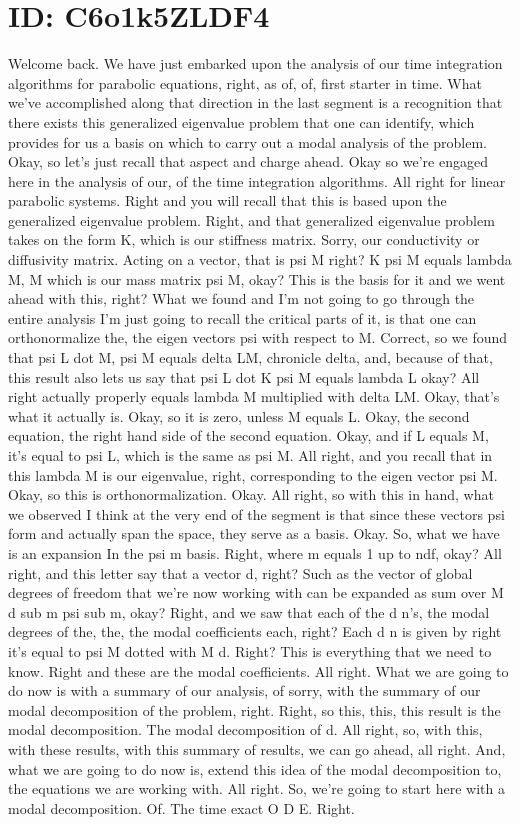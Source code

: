 \documentclass[10pt]{article}
\begin{document}
\section*{ID: C6o1k5ZLDF4}
Welcome back. We have just embarked upon the analysis of our time integration algorithms for parabolic equations, right, as of, of, first starter in time. What we've accomplished along that direction in the last segment is a recognition that there exists this generalized eigenvalue problem that one can identify, which provides for us a basis on which to carry out a modal analysis of the problem. Okay, so let's just recall that aspect and charge ahead. Okay so we're engaged here in the analysis of our, of the time integration algorithms. All right for linear parabolic systems. Right and you will recall that this is based upon the generalized eigenvalue problem. Right, and that generalized eigenvalue problem takes on the form K, which is our stiffness matrix. Sorry, our conductivity or diffusivity matrix. Acting on a vector, that is psi M right? K psi M equals lambda M, M which is our mass matrix psi M, okay? This is the basis for it and we went ahead with this, right? What we found and I'm not going to go through the entire analysis I'm just going to recall the critical parts of it, is that one can orthonormalize the, the eigen vectors psi with respect to M. Correct, so we found that psi L dot M, psi M equals delta LM, chronicle delta, and, because of that, this result also lets us say that psi L dot K psi M equals lambda L okay? All right actually properly equals lambda M multiplied with delta LM. Okay, that's what it actually is. Okay, so it is zero, unless M equals L. Okay, the second equation, the right hand side of the second equation. Okay, and if L equals M, it's equal to psi L, which is the same as psi M. All right, and you recall that in this lambda M is our eigenvalue, right, corresponding to the eigen vector psi M. Okay, so this is orthonormalization. Okay. All right, so with this in hand, what we observed I think at the very end of the segment is that since these vectors psi form and actually span the space, they serve as a basis. Okay. So, what we have is an expansion In the psi m basis. Right, where m equals 1 up to ndf, okay? All right, and this letter say that a vector d, right? Such as the vector of global degrees of freedom that we're now working with can be expanded as sum over M d sub m psi sub m, okay? Right, and we saw that each of the d n's, the modal degrees of the, the, the modal coefficients each, right? Each d n is given by right it's equal to psi M dotted with M d. Right? This is everything that we need to know. Right and these are the modal coefficients. All right. What we are going to do now is with a summary of our analysis, of sorry, with the summary of our modal decomposition of the problem, right. Right, so this, this, this result is the modal decomposition. The modal decomposition of d. All right, so, with this, with these results, with this summary of results, we can go ahead, all right. And, what we are going to do now is, extend this idea of the modal decomposition to, the equations we are working with. All right. So, we're going to start here with a modal decomposition. Of. The time exact O D E. Right. 
\end{document}
